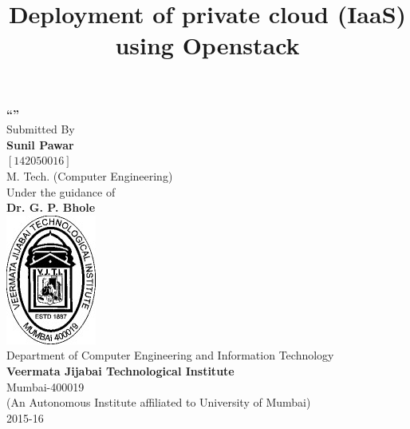 \begin{titlepage}
\begin{center}
\vspace{0.1cm}
\vspace{0.3cm}
\title{Deployment of private cloud (IaaS) using Openstack}
\makeatletter
\textbf{\LARGE \vspace{0.2cm}\textquotedblleft \@title \textquotedblright }\\
\vspace{0.3cm}
\Large Submitted By\\
\vspace{0.3cm}
\textbf{Sunil Pawar}\\
\vspace{0.1cm}
$[142050016]$\\
{M. Tech. (Computer Engineering)}\\
\vspace{0.5cm}
Under the guidance of\\
\vspace{0.2cm}
\textbf{Dr. G. P. Bhole}\\
\vspace{1cm}
\includegraphics{logo.jpg}\\
\vspace{0.3cm}
Department of Computer Engineering and Information Technology\\
\vspace{0.2cm}
\textbf{Veermata Jijabai Technological Institute}\\
\vspace{0.1cm}
Mumbai-400019\\
\vspace{0.2cm}
(An Autonomous Institute affiliated to University of Mumbai)\\
2015-16
\end{center}
\end{titlepage}
\makeatother